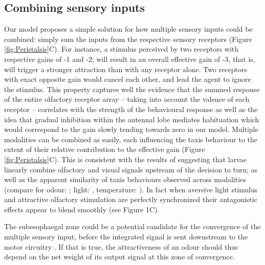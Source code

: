 \documentclass[11pt,a4paper]{article}
\newcommand{\todoML}[1]{\todo[author=ML,color=white, size=\tiny,inline]{#1}}
\begin{document}
\subsection{Combining sensory inputs}
Our model proposes a simple solution for how multiple sensory inputs could be combined: simply sum the inputs from the respective sensory receptors (Figure \ref{fig:Peristalsis}C). For instance, a stimulus perceived by two receptors with respective gains of -1 and -2; will result in an overall effective gain of -3, that is, will trigger a stronger attraction than with any receptor alone. Two receptors with exact opposite gain would cancel each other, and lead the agent to ignore the stimulus. This property captures well the evidence that the summed response of the entire olfactory receptor array – taking into account the valence of each receptor – correlates with the strength of the behavioural response \citep{kreher2008translation} as well as the idea that gradual inhibition within the antennal lobe mediates habituation \citep{das2011plasticity} which would correspond to the gain slowly tending towards zero in our model. 
Multiple modalities can be combined as easily, each influencing the taxis behaviour to the extent of their relative contribution to the effective gain (Figure \ref{fig:Peristalsis}C). This is consistent with the results of \cite{gepner2015computations} suggesting that larvae linearly combine olfactory and visual signals upstream of the decision to turn; as well as the apparent similarity of taxis behaviours observed across modalities (compare for odour: \citep{gomez2011active}; light: \cite{kane2013sensorimotor},   temperature: \cite{lahiri2011two}). In fact when aversive light stimulus and attractive olfactory stimulation are perfectly synchronized their antagonistic effects appear to blend smoothly (see \cite{bellmann2010optogenetically} Figure 1C). 

The subesophaegal zone could be a potential candidate for the convergence of the multiple sensory input, before the integrated signal is sent downstream to the motor circuitry \cite{tastekin2015role}. If that is true, the attractiveness of an odour should thus depend on the net weight of its output signal at this zone of convergence.  
\end{document}
